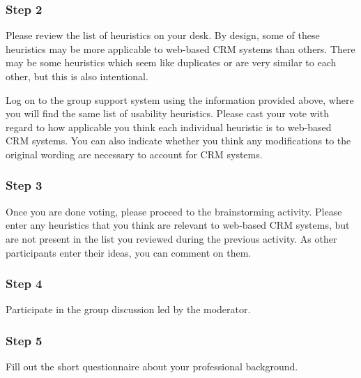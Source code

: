 \subsubsection*{Step 2}
Please review the list of heuristics on your desk. By design, some of these heuristics may be more applicable to web-based CRM systems than others. There may be some heuristics which seem like duplicates or are very similar to each other, but this is also intentional.

Log on to the group support system using the information provided above, where you will find the same list of usability heuristics. Please cast your vote with regard to how applicable you think each individual heuristic is to web-based CRM systems. You can also indicate whether you think any modifications to the original wording are necessary to account for CRM systems.

\subsubsection*{Step 3}
Once you are done voting, please proceed to the brainstorming activity. Please enter any heuristics that you think are relevant to web-based CRM systems, but are not present in the list you reviewed during the previous activity. As other participants enter their ideas, you can comment on them.

\subsubsection*{Step 4}
Participate in the group discussion led by the moderator.

\subsubsection*{Step 5}
Fill out the short questionnaire about your professional background.
